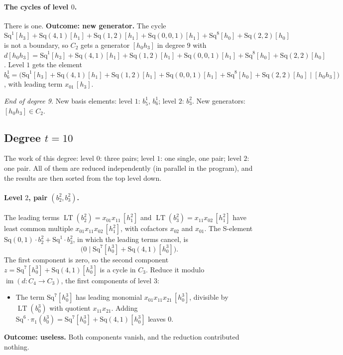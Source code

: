 \documentclass[11pt]{article}
\newcommand{\Sq}{\mathrm{Sq}}
\DeclareMathOperator{\LT}{LT}
\begin{document}
\paragraph{The cycles of level $0$.} There is one.
\textbf{Outcome: new generator.} The cycle $\Sq^{1}[h_3] + \Sq(4,1)[h_1] + \Sq(1,2)[h_1] + \Sq(0,0,1)[h_1] + \Sq^{8}[h_0] + \Sq(2,2)[h_0]$ is not a boundary, so $C_{2}$ gets a generator $[h_0h_3]$ in degree $9$ with $d[h_0h_3] = \Sq^{1}[h_3] + \Sq(4,1)[h_1] + \Sq(1,2)[h_1] + \Sq(0,0,1)[h_1] + \Sq^{8}[h_0] + \Sq(2,2)[h_0]$.
Level $1$ gets the element $b^{1}_{6} = \bigl(\Sq^{1}[h_3] + \Sq(4,1)[h_1] + \Sq(1,2)[h_1] + \Sq(0,0,1)[h_1] + \Sq^{8}[h_0] + \Sq(2,2)[h_0] \;\big|\; [h_0h_3]\bigr)$, with leading term $x_{01}\,[h_3]$.
\medskip
\par\noindent\emph{End of degree 9.} New basis elements: level $1$: $b^{1}_{5}$, $b^{1}_{6}$; level $2$: $b^{2}_{3}$. New generators: $[h_0h_3]\in C_{2}$.
\subsection*{Degree $t = 10$}
\noindent The work of this degree: level $0$: three pairs; level $1$: one single, one pair; level $2$: one pair. All of them are reduced independently (in parallel in the program), and the results are then sorted from the top level down.
\medskip
\paragraph{Level $2$, pair $(b^{2}_{2}, b^{2}_{3})$.} The leading terms $\LT(b^{2}_{2}) = x_{01}x_{11}\,[h_1^2]$ and $\LT(b^{2}_{3}) = x_{11}x_{02}\,[h_1^2]$ have least common multiple $x_{01}x_{11}x_{02}\,[h_1^2]$, with cofactors $x_{02}$ and $x_{01}$. The S-element $\Sq(0,1)\cdot b^{2}_{2} + \Sq^{1}\cdot b^{2}_{3}$, in which the leading terms cancel, is
\[\bigl(0 \;\big|\; \Sq^{7}[h_0^3] + \Sq(4,1)[h_0^3]\bigr).\]
The first component is zero, so the second component $z = \Sq^{7}[h_0^3] + \Sq(4,1)[h_0^3]$ is a cycle in $C_{3}$.
Reduce it modulo $\operatorname{im}(d\colon C_{4}\to C_{3})$, the first components of level $3$:
\begin{itemize}
\item The term $\Sq^{7}[h_0^3]$ has leading monomial $x_{01}x_{11}x_{21}\,[h_0^3]$, divisible by $\LT(b^{3}_{0})$ with quotient $x_{11}x_{21}$. Adding $\Sq^{6}\cdot \pi_1(b^{3}_{0}) = \Sq^{7}[h_0^3] + \Sq(4,1)[h_0^3]$ leaves $0$.
\end{itemize}
\textbf{Outcome: useless.} Both components vanish, and the reduction contributed nothing.
\medskip
\end{document}
